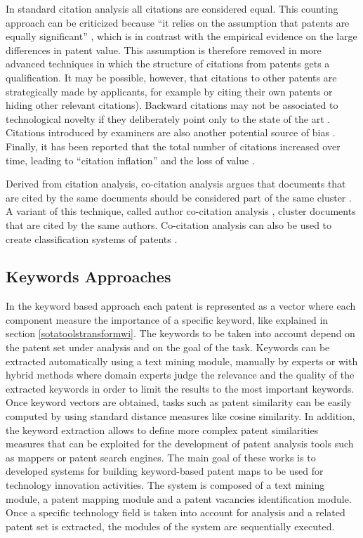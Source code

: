 \documentclass[b5paper,]{book}
\theoremstyle{definition}
\theoremstyle{definition}
\theoremstyle{definition}
\theoremstyle{remark}
\begin{document}
In standard citation analysis all citations are considered equal. This
counting approach can be criticized because ``it relies on the
assumption that patents are equally significant'' \citep{gerken2012new},
which is in contrast with the empirical evidence on the large
differences in patent value. This assumption is therefore removed in
more advanced techniques in which the structure of citations from
patents gets a qualification. It may be possible, however, that
citations to other patents are strategically made by applicants, for
example by citing their own patents or hiding other relevant citations).
Backward citations may not be associated to technological novelty if
they deliberately point only to the state of the art
\citep{rost2011strength}. Citations introduced by examiners are also
another potential source of bias \citep{alcacer2006patent}. Finally, it
has been reported that the total number of citations increased over
time, leading to ``citation inflation'' and the loss of value
\citep{hall2001nber}.

Derived from citation analysis, co-citation analysis argues that
documents that are cited by the same documents should be considered part
of the same cluster \citep{small2006tracking, small1985clustering}. A
variant of this technique, called author co-citation analysis
\citep{white1981author}, cluster documents that are cited by the same
authors. Co-citation analysis can also be used to create classification
systems of patents \citep{lai2005using}.

\subsection{Keywords Approaches}\label{keywords-approaches}

In the keyword based approach each patent is represented as a vector
where each component measure the importance of a specific keyword, like
explained in section \ref{sotatoolstransformwi}. The keywords to be
taken into account depend on the patent set under analysis and on the
goal of the task. Keywords can be extracted automatically using a text
mining module, manually by experts or with hybrid methods where domain
experts judge the relevance and the quality of the extracted keywords in
order to limit the results to the most important keywords. Once keyword
vectors are obtained, tasks such as patent similarity can be easily
computed by using standard distance measures like cosine similarity. In
addition, the keyword extraction allows to define more complex patent
similarities measures \citep{moehrle2010measures} that can be exploited
for the development of patent analysis tools
\citep{lee2009approach, lee2015novelty} such as mappers or patent search
engines. The main goal of these works is to developed systems for
building keyword-based patent maps to be used for technology innovation
activities. The system is composed of a text mining module, a patent
mapping module and a patent vacancies identification module. Once a
specific technology field is taken into account for analysis and a
related patent set is extracted, the modules of the system are
sequentially executed.
\end{document}
